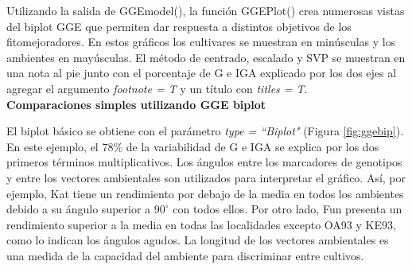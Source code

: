 Utilizando la salida de \textcolor{fandango}{GGEmodel()}, la función 
\textcolor{fandango}{GGEPlot()} crea numerosas vistas del biplot GGE que permiten dar respuesta a distintos objetivos de los fitomejoradores. En estos gráficos los cultivares se muestran en minúsculas y los ambientes en mayúsculas. El método de centrado, escalado y SVP se muestran en una nota al pie junto con el porcentaje de G e IGA explicado por los dos ejes al agregar el argumento \emph{footnote = T} y un título con \emph{titles = T}. \\

\textbf{Comparaciones simples utilizando GGE biplot}

El biplot básico se obtiene con el parámetro \emph{type = ``Biplot"} (Figura \ref{fig:ggebip}). En este ejemplo, el 78\% de la variabilidad de G e IGA se explica por los dos primeros términos multiplicativos. Los ángulos entre los marcadores de genotipos y entre los vectores ambientales son utilizados para interpretar el gráfico. Así, por ejemplo, Kat tiene un rendimiento por debajo de la media en todos los ambientes debido a su ángulo superior a $90^{\circ}$ con todos ellos. Por otro lado, Fun presenta un rendimiento superior a la media en todas las localidades excepto OA93 y KE93, como lo indican los ángulos agudos. La longitud de los vectores ambientales es una medida de la capacidad del ambiente para discriminar entre cultivos. 




